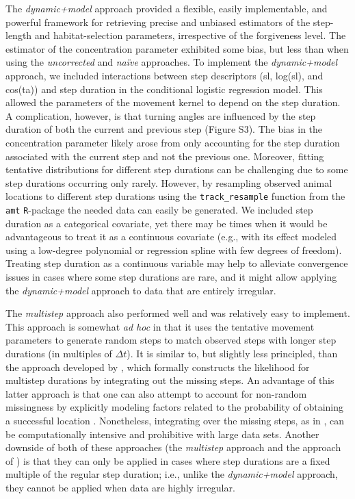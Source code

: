\documentclass[abstract=on,10pt,a4paper,bibliography=totocnumbered]{article}
\begin{document}
The \textit{dynamic+model} approach provided a flexible, easily implementable,
and powerful framework for retrieving precise and unbiased estimators of the
step-length and habitat-selection parameters, irrespective of the forgiveness
level. The estimator of the concentration parameter exhibited some bias, but
less than when using the \textit{uncorrected} and \textit{na\"ive} approaches.
To implement the \textit{dynamic+model} approach, we included interactions
between step descriptors (sl, log(sl), and cos(ta)) and step duration in the
conditional logistic regression model. This allowed the parameters of the
movement kernel to depend on the step duration. A complication, however, is that
turning angles are influenced by the step duration of both the current and
previous step (Figure S3). The bias in the concentration parameter likely arose
from only accounting for the step duration associated with the current step and
not the previous one. Moreover, fitting tentative distributions for different
step durations can be challenging due to some step durations occurring only
rarely. However, by resampling observed animal locations to different step
durations using the \texttt{track\_resample} function from the \texttt{amt}
\texttt{R}-package \citep{Signer.2019} the needed data can easily be generated.
We included step duration as a categorical covariate, yet there may be times
when it would be advantageous to treat it as a continuous covariate (e.g., with
its effect modeled using a low-degree polynomial or regression spline with few
degrees of freedom). Treating step duration as a continuous variable may help to
alleviate convergence issues in cases where some step durations are rare, and it
might allow applying the \textit{dynamic+model} approach to data that are
entirely irregular.

The \textit{multistep} approach also performed well and was relatively easy to
implement. This approach is somewhat \textit{ad hoc} in that it uses the
tentative movement parameters to generate random steps to match observed steps
with longer step durations (in multiples of $\Delta t$). It is similar to, but
slightly less principled, than the approach developed by \citet{Vales.2022},
which formally constructs the likelihood for multistep durations by integrating
out the missing steps. An advantage of this latter approach is that one can also
attempt to account for non-random missingness by explicitly modeling factors
related to the probability of obtaining a successful location
\citep{Vales.2022}. Nonetheless, integrating over the missing steps, as in
\citet{Vales.2022}, can be computationally intensive and prohibitive with large
data sets. Another downside of both of these approaches (the \textit{multistep}
approach and the approach of \citealp{Vales.2022}) is that they can only be
applied in cases where step durations are a fixed multiple of the regular
step duration; i.e., unlike the \textit{dynamic+model} approach, they cannot be
applied when data are highly irregular.
\end{document}
